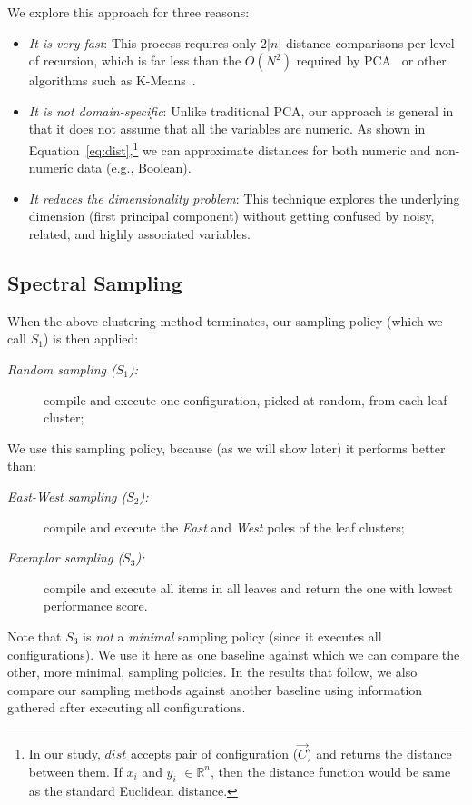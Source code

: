 \documentclass[smallextended]{svjour3}       %
\begin{document}
We explore this approach for three reasons:
\begin{itemize}
\item
{\em It is very fast}:
This process requires only $2|n|$ distance comparisons
per level of recursion, which is far less than the $O(N^2)$
required by PCA~\cite{Du2008}
or other  algorithms such as K-Means~\cite{hamerly2010making}.
\item
{\em It is not domain-specific}:
Unlike traditional PCA, our approach is general in that it does not assume that all the variables are numeric. As shown in Equation~\ref{eq:dist},\footnote{In our study, $\mathit{dist}$ accepts pair of configuration ($\vec{C}$) and returns the distance between them. If $x_i$ and $y_i$ $\in \mathbb{R}^n$, then the distance function would be same as the standard Euclidean distance.} we can approximate distances for both numeric and non-numeric data (e.g., Boolean).

\item
{\em It reduces the dimensionality problem}:
This technique explores the underlying dimension (first principal component) without getting confused by noisy, related, and highly associated variables.
\end{itemize}

\subsection{Spectral Sampling}\label{sect:sample}
When the above clustering method terminates, our  sampling policy (which we call $S_1$) is then applied:
\begin{description}
\item[{\em Random sampling ($S_1$):}] compile and execute one  configuration,  picked at random, from each leaf cluster;
\end{description}
We use this sampling policy, because (as we will show later) it performs better than:
\begin{description}
\item[{\em East-West sampling ($S_2$):}] compile and execute the {\em East} and {\em West} poles of the leaf clusters;
\item[{\em Exemplar sampling ($S_3$):}] compile and execute all items in all leaves and return the one
with lowest performance score.
\end{description}

Note that $S_3$ is {\em not} a {\em minimal} sampling policy (since it executes all configurations). 
We use it here as one  baseline
against which we can compare the other, more minimal, sampling policies. In the results
that follow, we also compare our 
sampling methods against another baseline using information gathered after executing
all configurations.
\end{document}
